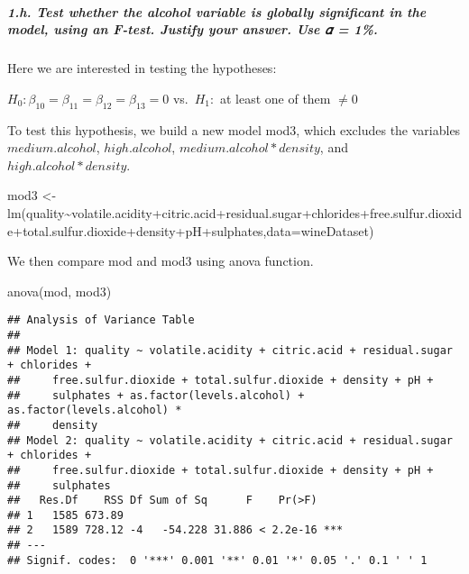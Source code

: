 \documentclass[
]{article}
\newenvironment{Shaded}{\begin{snugshade}}{\end{snugshade}}
\newcommand{\AttributeTok}[1]{\textcolor[rgb]{0.77,0.63,0.00}{#1}}
\newcommand{\FunctionTok}[1]{\textcolor[rgb]{0.00,0.00,0.00}{#1}}
\newcommand{\NormalTok}[1]{#1}
\newcommand{\OtherTok}[1]{\textcolor[rgb]{0.56,0.35,0.01}{#1}}
\newcommand{\SpecialCharTok}[1]{\textcolor[rgb]{0.00,0.00,0.00}{#1}}
\begin{document}
\hypertarget{h.-test-whether-the-alcohol-variable-is-globally-significant-in-the-model-using-an-f-test.-justify-your-answer.-use-ux1d6fc-1.}{%
\subparagraph{1.h. Test whether the alcohol variable is globally
significant in the model, using an F-test. Justify your answer. Use 𝛼 =
1\%.}\label{h.-test-whether-the-alcohol-variable-is-globally-significant-in-the-model-using-an-f-test.-justify-your-answer.-use-ux1d6fc-1.}}

Here we are interested in testing the hypotheses:

\(H_0: \beta_{10} = \beta_{11} = \beta_{12} = \beta_{13} =0\)
vs.~\(H_1:\) at least one of them \(\neq 0\)

To test this hypothesis, we build a new model mod3, which excludes the
variables \(medium.alcohol\), \(high.alcohol\),
\(medium.alcohol*density\), and \(high.alcohol*density\).

\begin{Shaded}
\begin{Highlighting}[]
\NormalTok{mod3 }\OtherTok{\textless{}{-}} \FunctionTok{lm}\NormalTok{(quality}\SpecialCharTok{\textasciitilde{}}\NormalTok{volatile.acidity}\SpecialCharTok{+}\NormalTok{citric.acid}\SpecialCharTok{+}\NormalTok{residual.sugar}\SpecialCharTok{+}\NormalTok{chlorides}\SpecialCharTok{+}\NormalTok{free.sulfur.dioxide}\SpecialCharTok{+}\NormalTok{total.sulfur.dioxide}\SpecialCharTok{+}\NormalTok{density}\SpecialCharTok{+}\NormalTok{pH}\SpecialCharTok{+}\NormalTok{sulphates,}\AttributeTok{data=}\NormalTok{wineDataset)}
\end{Highlighting}
\end{Shaded}

We then compare mod and mod3 using anova function.

\begin{Shaded}
\begin{Highlighting}[]
\FunctionTok{anova}\NormalTok{(mod, mod3)}
\end{Highlighting}
\end{Shaded}

\begin{verbatim}
## Analysis of Variance Table
## 
## Model 1: quality ~ volatile.acidity + citric.acid + residual.sugar + chlorides + 
##     free.sulfur.dioxide + total.sulfur.dioxide + density + pH + 
##     sulphates + as.factor(levels.alcohol) + as.factor(levels.alcohol) * 
##     density
## Model 2: quality ~ volatile.acidity + citric.acid + residual.sugar + chlorides + 
##     free.sulfur.dioxide + total.sulfur.dioxide + density + pH + 
##     sulphates
##   Res.Df    RSS Df Sum of Sq      F    Pr(>F)    
## 1   1585 673.89                                  
## 2   1589 728.12 -4   -54.228 31.886 < 2.2e-16 ***
## ---
## Signif. codes:  0 '***' 0.001 '**' 0.01 '*' 0.05 '.' 0.1 ' ' 1
\end{verbatim}
\end{document}
